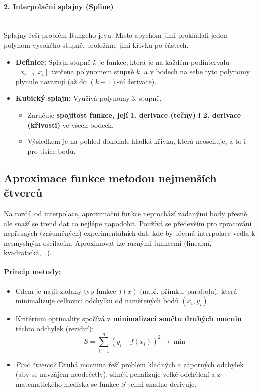 \paragraph*{2. Interpolační splajny (Spline)}~\\
Splajny řeší problém Rungeho jevu. Místo abychom jimi prokládali jeden polynom vysokého stupně, proložíme jimi křivku po částech. 
\begin{itemize}
    \item \textbf{Definice:} Splajn stupně $k$ je funkce, která je na každém podintervalu $[x_{i-1}, x_i]$ tvořena polynomem stupně $k$, a v bodech na sebe tyto polynomy plynule navazují (až do $(k-1)$-ní derivace).
    \item \textbf{Kubický splajn:} Využívá polynomy 3. stupně. 
    \begin{itemize}
        \item Zaručuje \textbf{spojitost funkce, její 1. derivace (tečny) i 2. derivace (křivosti)} ve všech bodech.
        \item Výsledkem je na pohled dokonale hladká křivka, která neosciluje, a to i pro tisíce bodů.
    \end{itemize}
\end{itemize}

\subsection{Aproximace funkce metodou nejmenších čtverců}
Na rozdíl od interpolace, aproximační funkce neprochází zadanými body přesně, ale snaží se trend dat co nejlépe napodobit. Používá se především pro zpracování nepřesných (zašuměných) experimentálních dat, kde by přesná interpolace vedla k nesmyslným oscilacím. Aproximovat lze různými funkcemi (linearní, kvadratická,...).

\paragraph*{Princip metody:}
\begin{itemize}
    \item Cílem je najít zadaný typ funkce $f(x)$ (např. přímku, parabolu), která minimalizuje celkovou odchylku od naměřených bodů $(x_i, y_i)$.
    \item Kritérium optimality spočívá v \textbf{minimalizaci součtu druhých mocnin} těchto odchylek (reziduí):
    \[ S = \sum_{i=1}^{n} (y_i - f(x_i))^2 \longrightarrow \min \]
    \item \textit{Proč čtverce?} Druhá mocnina řeší problém kladných a záporných odchylek (aby se navzájem neodečetly), silněji penalizuje velké odchýlení a z matematického hlediska se funkce $S$ velmi snadno derivuje.
\end{itemize}

